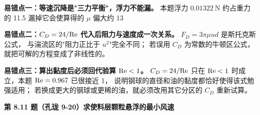 \begin{yicuo}
\textbf{易错点一：等速沉降是"三力平衡"，浮力不能漏。}
本题浮力 $0.01322\ \mathrm{N}$ 约占重力的 11.5%
漏掉它会使算得的 $\mu$ 偏大约 13%

\textbf{易错点二：$C_D=24/\mathrm{Re}$ 代入后阻力与速度成一次关系。}
$F_D=3\pi\mu u d$ 是斯托克斯公式，
与湍流区的"阻力正比于 $u^{2}$"完全不同；
若误用 $C_D$ 为常数的牛顿区公式，就把可解的方程变成了非线性的。

\textbf{易错点三：算出黏度后必须回代验算 $\mathrm{Re}<1$。}
$C_D=24/\mathrm{Re}$ 只在 $\mathrm{Re}<1$ 时成立，本题 $\mathrm{Re}=0.967$ 已很接近 1，
说明钢球的直径和油的黏度都恰好使得该式勉强适用；
若换成更大的钢球或更稀的油，就必须改用其它分区的 $C_D$ 重新试算。
\end{yicuo}

\noindent\textbf{第 8.11 题（孔珑 9-20）\quad 求使料层颗粒悬浮的最小风速}

